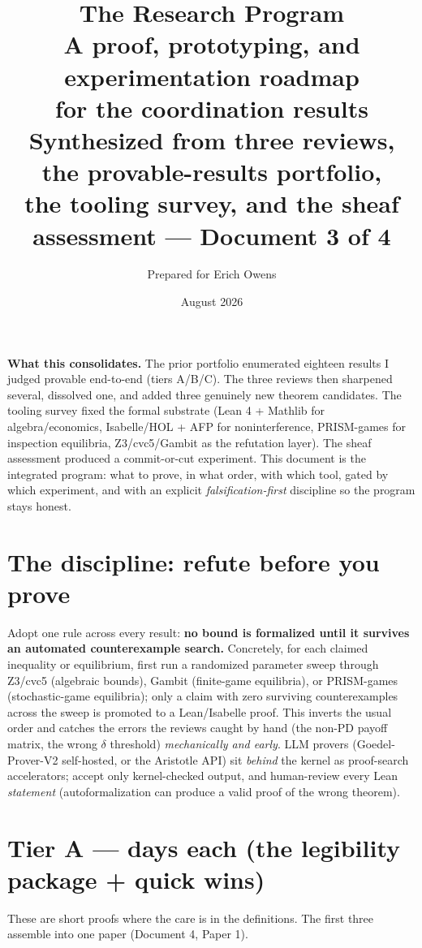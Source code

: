 \documentclass[11pt,a4paper]{article}
\title{\textbf{The Research Program}\\[4pt]
\large A proof, prototyping, and experimentation roadmap\\ for the coordination results\\[3pt]
\normalsize Synthesized from three reviews, the provable-results portfolio,\\ the tooling survey, and the sheaf assessment --- Document 3 of 4}
\author{Prepared for Erich Owens}
\date{August 2026}
\begin{document}
\maketitle

\noindent\textbf{What this consolidates.} The prior portfolio enumerated eighteen results I judged provable end-to-end (tiers A/B/C). The three reviews then sharpened several, dissolved one, and added three genuinely new theorem candidates. The tooling survey fixed the formal substrate (Lean 4 + Mathlib for algebra/economics, Isabelle/HOL + AFP for noninterference, PRISM-games for inspection equilibria, Z3/cvc5/Gambit as the refutation layer). The sheaf assessment produced a commit-or-cut experiment. This document is the integrated program: what to prove, in what order, with which tool, gated by which experiment, and with an explicit \emph{falsification-first} discipline so the program stays honest.

\section{The discipline: refute before you prove}
Adopt one rule across every result: \textbf{no bound is formalized until it survives an automated counterexample search.} Concretely, for each claimed inequality or equilibrium, first run a randomized parameter sweep through Z3/cvc5 (algebraic bounds), Gambit (finite-game equilibria), or PRISM-games (stochastic-game equilibria); only a claim with zero surviving counterexamples across the sweep is promoted to a Lean/Isabelle proof. This inverts the usual order and catches the errors the reviews caught by hand (the non-PD payoff matrix, the wrong $\delta$ threshold) \emph{mechanically and early}. LLM provers (Goedel-Prover-V2 self-hosted, or the Aristotle API) sit \emph{behind} the kernel as proof-search accelerators; accept only kernel-checked output, and human-review every Lean \emph{statement} (autoformalization can produce a valid proof of the wrong theorem).

\section{Tier A --- days each (the legibility package + quick wins)}
These are short proofs where the care is in the definitions. The first three assemble into one paper (Document 4, Paper 1).
\end{document}
